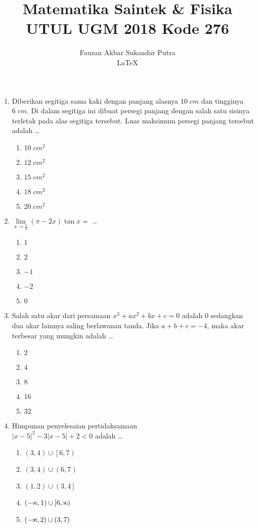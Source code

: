 \documentclass[A4,12PT, english, twocolumn]{journal}
\title{Matematika Saintek \& Fisika UTUL UGM 2018 Kode 276}
\author{Fauzan Akbar Sukandar Putra \\ \LaTeX}
\def\infinity{\rotatebox{90}{8}}
\begin{document}
\maketitle

\begin{enumerate}
\item Diberikan segitiga sama kaki dengan panjang alasnya $10 \; cm$ dan tingginya $6 \; cm$. Di dalam segitiga ini dibuat persegi panjang dengan salah satu sisinya terletak pada alas segitiga tersebut. Luas maksimum persegi panjang tersebut adalah \dots
    \begin{enumerate}
        \item $10 \; cm^2$
        \item $12 \; cm^2$
        \item $15 \; cm^2$
        \item $18 \; cm^2$
        \item $20 \; cm^2$
    \end{enumerate}
  
\item $\lim\limits_{x \longrightarrow \frac{\pi}{2}}{\left(\pi - 2x \right)\tan x =}$ \dots
    \begin{enumerate}
        \item $1$
        \item $2$
        \item $-1$
        \item $-2$
        \item $0$
    \end{enumerate}
     
\item Salah satu akar dari persamaan $x^3+ax^2+bx+c=0$ adalah $0$ sedangkan dua akar lainnya saling berlawanan tanda. Jika $a+b+c=-4$, maka akar terbesar yang mungkin adalah \dots
    \begin{enumerate}
        \item $2$
        \item $4$
        \item $8$
        \item $16$
        \item $32$
    \end{enumerate}
   
\item Himpunan penyelesaian pertidaksamaan \\ $\left|x-5 \right|^2-3 \left|x-5 \right| + 2 < 0$ adalah \dots
    \begin{enumerate}
        \item $\left(3,4 \right) \cup \left[6,7 \right)$
        \item $\left(3,4 \right) \cup \left(6,7 \right)$
        \item $\left(1,2 \right) \cup \left(3,4 \right]$
        \item $\left(- \infinity,1 \right) \cup \left[6, \infinity \right)$
        \item $\left(- \infinity,2 \right) \cup \left(3,7 \right)$
    \end{enumerate}


\end{enumerate}
\end{document}
